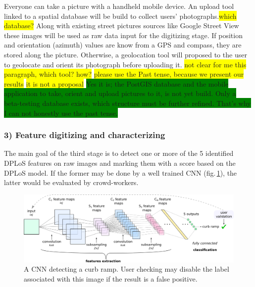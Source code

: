 \documentclass[10pt,conference,a4paper]{IEEEtran}
\begin{document}
Everyone can take a picture with a handheld mobile device. An upload tool linked to a spatial database will be build to collect users' photographs.\colorbox{yellow}{which database?} Along with existing street pictures sources like Google Street View %
these images will be used as raw data input for the digitizing stage.
If position and orientation (azimuth) values are know from a GPS and compass, they are stored along the picture. Otherwise, a geolocation tool will proposed to the user to geolocate and orient its photograph before uploading it. %
\colorbox{yellow}{not clear for me this paragraph, which tool? how?}
\colorbox{yellow}{please use the Past tense, because we present our results}
\colorbox{yellow}{it is not a proposal}
\colorbox{green}{Yes it is; the PostGIS database and the mobile application to take, orient and upload pictures to it, is not yet build. Only a beta-testing database exists, which structure must be further refined. That's why I can not honestly use the past tense.}


\subsubsection*{3) Feature digitizing and characterizing}
The main goal of the third stage %
is to detect one or more of the 5 identified DPLoS features on raw images and marking them with a score based on the DPLoS model. If the former may be done by a well trained CNN (fig.\,\ref{cnn}), the latter would be evaluated by crowd-workers.

\begin{figure}[ht]
\begin{center}
\includegraphics[width=1.0\linewidth]{architecture.png}
\end{center}
   \caption{A CNN detecting a curb ramp. User checking may disable the label associated with this image if the result is a false positive.}\label{cnn}
\end{figure}
\end{document}
